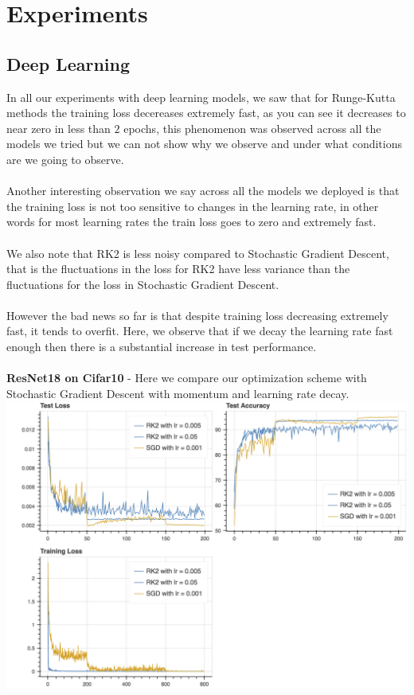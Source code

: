 \section{Experiments}
\subsection{Deep Learning}
In all our experiments with deep learning models, we saw that for Runge-Kutta methods the training loss decereases extremely fast, as you can see it decreases to near zero in less than $2$ epochs, this phenomenon was observed across all the models we tried but we can not show why we observe and under what conditions are we going to observe.
\\
\\
Another interesting observation we say across all the models we deployed is that the training loss is not too sensitive to changes in the learning rate, in other words for most learning rates the train loss goes to zero and extremely fast.
\\
\\
We also note that RK2 is less noisy compared to Stochastic Gradient Descent, that is the fluctuations in the loss for RK2 have less variance than the fluctuations for the loss in Stochastic Gradient Descent.
\\
\\
However the bad news so far is that despite training loss decreasing extremely fast, it tends to overfit. Here, we observe that if we decay the learning rate fast enough then there is a substantial increase in test performance.
\\
\\
\textbf{ResNet18 on Cifar10} -
Here we compare our optimization scheme with Stochastic Gradient Descent with momentum and learning rate decay.
\\
\includegraphics[scale=0.4]{cifar.png}
